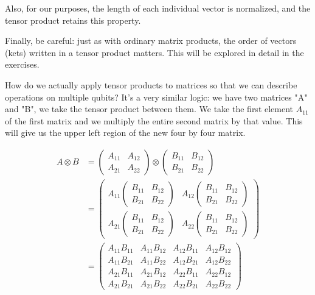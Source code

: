 Also, for our purposes, the length of each individual vector is normalized, and the tensor product retains this property.

Finally, be careful: just as with ordinary matrix products, the order of vectors (kets) written in a tensor product matters. This will be explored in detail in the exercises.

How do we actually apply tensor products to matrices so that we can describe operations on multiple qubits? It's a very similar logic: we have two matrices "A" and "B", we take the tensor product between them. We take the first element $A_{11}$ of the first matrix and we multiply the entire second matrix by that value. This will give us the upper left region of the new four by four matrix. 

\begin{equation}
\begin{aligned}
A \otimes B &=\left(\begin{array}{ll}
A_{11} & A_{12} \\
A_{21} & A_{22}
\end{array}\right) \otimes\left(\begin{array}{ll}
B_{11} & B_{12} \\
B_{21} & B_{22}
\end{array}\right) \\
&=\left(\begin{array}{lll}
A_{11}\left(\begin{array}{ll}
B_{11} & B_{12} \\
B_{21} & B_{22}
\end{array}\right) & A_{12}\left(\begin{array}{ll}
B_{11} & B_{12} \\
B_{21} & B_{22}
\end{array}\right) \\
A_{21}\left(\begin{array}{ll}
B_{11} & B_{12} \\
B_{21} & B_{22}
\end{array}\right) & A_{22}\left(\begin{array}{ll}
B_{11} & B_{12} \\
B_{21} & B_{22}
\end{array}\right)
\end{array}\right) \\
&=\left(\begin{array}{llll}
A_{11} B_{11} & A_{11} B_{12} & A_{12} B_{11} & A_{12} B_{12} \\
A_{11} B_{21} & A_{11} B_{22} & A_{12} B_{21} & A_{12} B_{22} \\
A_{21} B_{11} & A_{21} B_{12} & A_{22} B_{11} & A_{22} B_{12} \\
A_{21} B_{21} & A_{21} B_{22} & A_{22} B_{21} & A_{22} B_{22}
\end{array}\right)
\end{aligned}
\end{equation}


